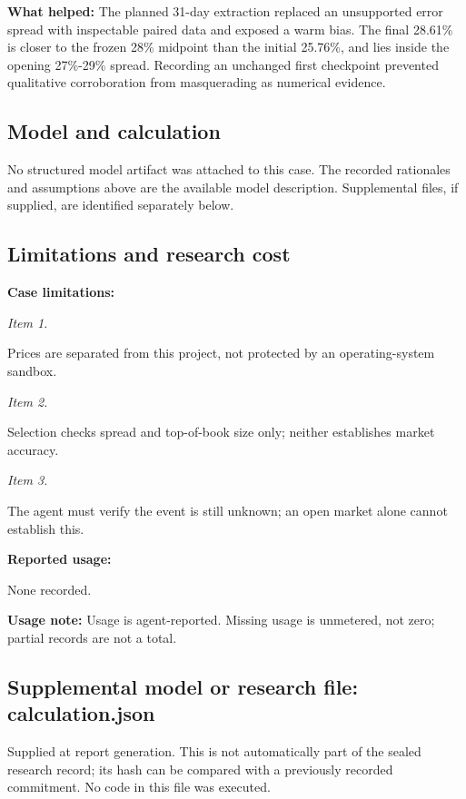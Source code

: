 \documentclass[11pt]{article}
\begin{document}
\par\noindent\textbf{What helped:} The planned 31-day extraction replaced an unsupported error spread with inspectable paired data and exposed a warm bias. The final 28.61\% is closer to the frozen 28\% midpoint than the initial 25.76\%, and lies inside the opening 27\%-29\% spread. Recording an unchanged first checkpoint prevented qualitative corroboration from masquerading as numerical evidence.

\subsection*{\textcolor{epdarkgreen}{Model and calculation}}
No structured model artifact was attached to this case. The recorded rationales and assumptions above are the available model description. Supplemental files, if supplied, are identified separately below.


\subsection*{\textcolor{epdarkgreen}{Limitations and research cost}}
\par\noindent\textbf{Case limitations:} \par \par\noindent\textit{Item 1.}\par Prices are separated from this project, not protected by an operating-system sandbox.

\par\noindent\textit{Item 2.}\par Selection checks spread and top-of-book size only; neither establishes market accuracy.

\par\noindent\textit{Item 3.}\par The agent must verify the event is still unknown; an open market alone cannot establish this.

\par\noindent\textbf{Reported usage:} \par None recorded.

\par\noindent\textbf{Usage note:} Usage is agent-reported. Missing usage is unmetered, not zero; partial records are not a total.

\subsection*{\textcolor{epdarkgreen}{Supplemental model or research file: calculation.json}}
Supplied at report generation. This is not automatically part of the sealed research record; its hash can be compared with a previously recorded commitment. No code in this file was executed.
\end{document}
